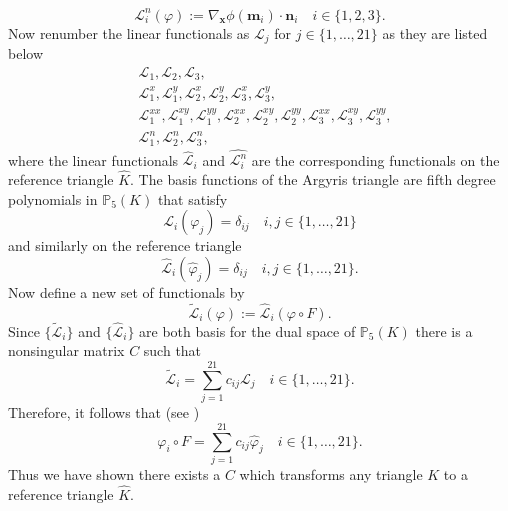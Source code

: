 \begin{equation*}
  \mathcal{L}_i^n(\varphi) := \nabla_{\mathbf{x}} \phi(\mathbf{m}_i) \cdot
  \mathbf{n}_i \quad i\in\{1,2,3\}.
\end{equation*}
Now renumber the linear functionals as $\mathcal{L}_j$ for
$j\in\{1,\dots,21\}$ as they are listed below
\begin{align*}
  &\mathcal{L}_1, \mathcal{L}_2, \mathcal{L}_3, \\
  &\mathcal{L}_1^x, \mathcal{L}_1^y, \mathcal{L}_2^x, \mathcal{L}_2^y,
    \mathcal{L}_3^x, \mathcal{L}_3^y, \\
  &\mathcal{L}_1^{xx}, \mathcal{L}_1^{xy}, \mathcal{L}_1^{yy},
    \mathcal{L}_2^{xx}, \mathcal{L}_2^{xy}, \mathcal{L}_2^{yy},
    \mathcal{L}_3^{xx}, \mathcal{L}_3^{xy}, \mathcal{L}_3^{yy}, \\
  &\mathcal{L}_1^n, \mathcal{L}_2^n, \mathcal{L}_3^n,
\end{align*}
where the linear functionals $\hat{\mathcal{L}}_i$ and $\hat{ \mathcal{L}_i^n}$
are the corresponding functionals on the reference triangle $\hat{K}$. The basis
functions of the Argyris triangle are fifth degree polynomials in
$\mathbb{P}_5(K)$
that satisfy
\begin{equation*}
  \mathcal{L}_i(\varphi_j) = \delta_{ij} \quad i,j\in\{1,\dots,21\}
\end{equation*}
and similarly on the reference triangle
\begin{equation*}
  \hat{\mathcal{L}}_i(\hat{\varphi}_j) = \delta_{ij} \quad
  i,j\in\{1,\dots,21\}.
\end{equation*}
Now define a new set of functionals by
\begin{equation}
  \tilde{\mathcal{L}}_i(\varphi) := \hat{\mathcal{L}}_i(\varphi\circ F).
  \label{eqn:Functional}
\end{equation}
Since $\{\tilde{\mathcal{L}}_i\}$ and $\{\hat{\mathcal{L}}_i\}$ are both basis
for the dual space of $\mathbb{P}_5(K)$ there is a nonsingular matrix $C$ such
that
\begin{equation}
  \tilde{\mathcal{L}}_i = \sum_{j=1}^{21} c_{ij} \mathcal{L}_j \quad i\in
  \{1,\dots,21\}.
  \label{eqn:FunctionalsC}
\end{equation}
Therefore, it follows that (see \cite{Dominguez08})
\begin{equation}
  \varphi_i\circ F = \sum_{j=1}^{21} c_{ij}\hat{\varphi}_j \quad i\in
  \{1,\dots,21\}.
  \label{eqn:PolyC}
\end{equation}
Thus we have shown there exists a $C$ which transforms any triangle $K$ to a
reference triangle $\hat{K}$.

